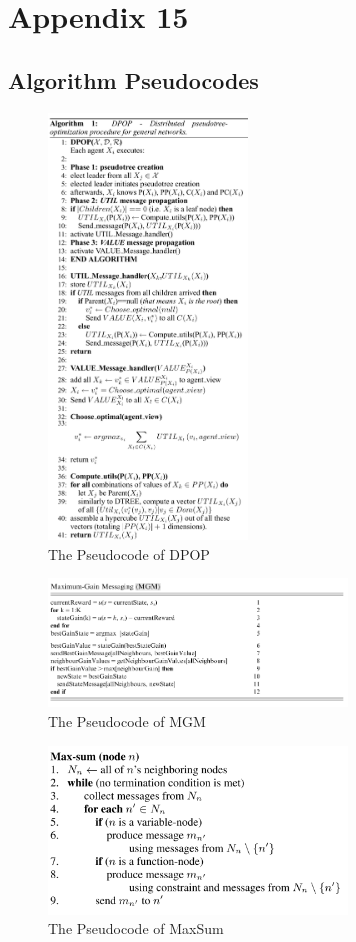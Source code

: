 \chapter{Appendix 15}
\label{a:appendix}

\section{Algorithm Pseudocodes}
\begin{figure}[H]
\includegraphics[width=200px]{graphics/dpop_ps}
\centering
\caption{The Pseudocode of DPOP}
\label{fig:dpopps}
\end{figure}
\begin{figure}[H]
\includegraphics[width=300px]{graphics/mgm_ps}
\centering
\caption{The Pseudocode of MGM}
\label{fig:mgmps}
\end{figure}
\begin{figure}[H]
\includegraphics[width=300px]{graphics/maxsum_ps}
\centering
\caption{The Pseudocode of MaxSum}
\label{fig:maxsumps}
\end{figure}

